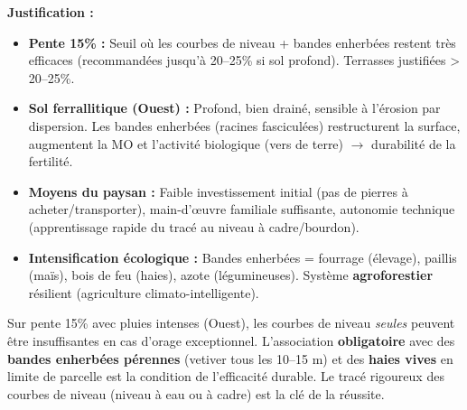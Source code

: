 \documentclass[11pt]{article}
\begin{document}
\begin{corrige}
\begin{enumerate}
    \textbf{Justification :}
    \begin{itemize}
        \item \textbf{Pente 15\% :} Seuil où les courbes de niveau + bandes enherbées restent très efficaces (recommandées jusqu'à 20--25\% si sol profond). Terrasses justifiées > 20--25\%.
        \item \textbf{Sol ferrallitique (Ouest) :} Profond, bien drainé, sensible à l'érosion par dispersion. Les bandes enherbées (racines fasciculées) restructurent la surface, augmentent la MO et l'activité biologique (vers de terre) $\rightarrow$ durabilité de la fertilité.
        \item \textbf{Moyens du paysan :} Faible investissement initial (pas de pierres à acheter/transporter), main-d'œuvre familiale suffisante, autonomie technique (apprentissage rapide du tracé au niveau à cadre/bourdon).
        \item \textbf{Intensification écologique :} Bandes enherbées = fourrage (élevage), paillis (maïs), bois de feu (haies), azote (légumineuses). Système \textbf{agroforestier} résilient (agriculture climato-intelligente).
    \end{itemize}
    \begin{attention}
    Sur pente 15\% avec pluies intenses (Ouest), les courbes de niveau \emph{seules} peuvent être insuffisantes en cas d'orage exceptionnel. L'association \textbf{obligatoire} avec des \textbf{bandes enherbées pérennes} (vetiver tous les 10--15 m) et des \textbf{haies vives} en limite de parcelle est la condition de l'efficacité durable. Le tracé rigoureux des courbes de niveau (niveau à eau ou à cadre) est la clé de la réussite.
    \end{attention}
\end{enumerate}
\end{corrige}
\end{document}
